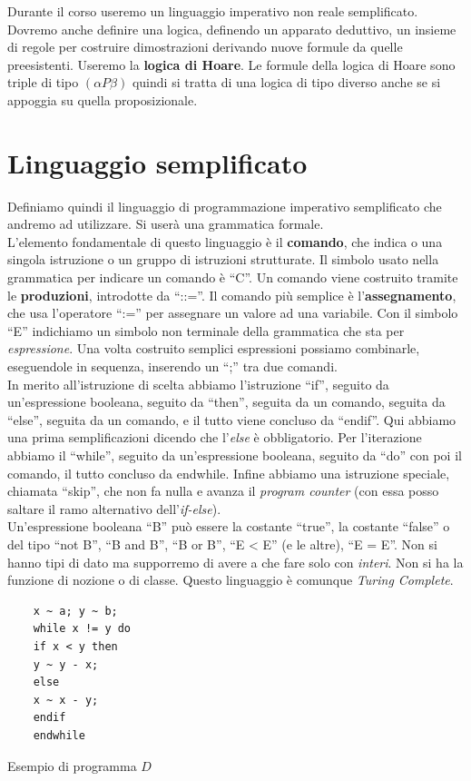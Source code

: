 \documentclass[a4paper,12pt, oneside]{book}
\begin{document}
Durante il corso useremo un linguaggio imperativo non reale semplificato.
Dovremo anche definire una logica, definendo un apparato deduttivo, un insieme
di regole per costruire dimostrazioni derivando nuove formule da quelle
preesistenti. Useremo la \textbf{logica di Hoare}. Le formule della logica di
Hoare sono triple di tipo $(\alpha P \beta)$ quindi si tratta di una logica di tipo diverso
anche se si appoggia su quella proposizionale.
\section{Linguaggio semplificato}
Definiamo quindi il linguaggio di programmazione imperativo semplificato che
andremo ad utilizzare. Si userà una grammatica formale.\\
L'elemento fondamentale di questo linguaggio è il \textbf{comando}, che indica o
una singola istruzione o un gruppo di istruzioni strutturate. Il simbolo usato
nella grammatica per indicare un comando è ``C''. Un comando viene costruito
tramite le \textbf{produzioni}, introdotte da ``::=''. Il comando più semplice è
l'\textbf{assegnamento}, che usa l'operatore ``:='' per assegnare un valore ad
una variabile. Con il simbolo ``E'' indichiamo un simbolo non terminale della
grammatica che sta per \textit{espressione}. Una volta costruito semplici
espressioni possiamo combinarle, eseguendole in sequenza, inserendo un ``;'' tra
due comandi.\\ 
In merito all'istruzione di scelta abbiamo l'istruzione ``if'', seguito da
un'espressione booleana, seguito da ``then'', seguita da un comando, seguita da
``else'', seguita da un comando, e il tutto viene concluso da ``endif''. Qui
abbiamo una prima semplificazioni dicendo che l'\textit{else} è
obbligatorio. Per l'iterazione abbiamo il ``while'', seguito da un'espressione
booleana, seguito da ``do'' con poi il comando, il tutto concluso da
endwhile. Infine abbiamo una istruzione speciale, chiamata ``skip'', che non fa
nulla e avanza il \textit{program counter} (con essa posso saltare il ramo
alternativo dell'\textit{if-else}).\\
Un'espressione booleana ``B'' può essere la costante ``true'', la costante
``false'' o del tipo ``not B'', ``B and B'', ``B or B'', ``E < E'' (e le altre),
``E = E''. Non si hanno tipi di dato ma supporremo di avere a che fare solo con
\textit{interi}. Non si ha la funzione di nozione o di classe. Questo linguaggio
è comunque \textit{Turing Complete}.
\begin{listing}[H]
  \begin{lstlisting}
    x ~ a; y ~ b;
    while x != y do
    if x < y then
    y ~ y - x;
    else
    x ~ x - y;
    endif
    endwhile  
  \end{lstlisting}
  \caption{Esempio di programma $D$}
  \label{listing:D}
\end{listing}
\end{document}
